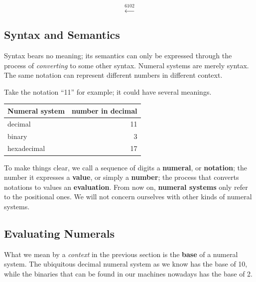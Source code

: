 \documentclass[\main/thesis.tex]{subfiles}
\begin{document}
$$ \xleftarrow{6102} $$

\subsection{Syntax and Semantics}

Syntax bears no meaning;
its semantics can only be expressed through the process of \textit{converting} to some other syntax.
Numeral systems are merely syntax.
The same notation can represent different numbers in different context.

Take the notation ``11'' for example; it could have several meanings.

\begin{center}
    \begin{tabular}{ | l | r | }
    \textbf{Numeral system}      & \textbf{number in decimal}  \\
    \hline
    decimal             & 11    \\
    binary              & 3     \\
    hexadecimal         & 17    \\
    \end{tabular}
\end{center}

To make things clear, we call a sequence of digits a \textbf{numeral}, or \textbf{notation};
the number it expresses a \textbf{value}, or simply a \textbf{number};
the process that converts notations to values an \textbf{evaluation}.
From now on, \textbf{numeral systems} only refer to the positional ones.
We will not concern ourselves with other kinds of numeral systems.

\subsection{Evaluating Numerals}

What we mean by a \textit{context} in the previous section is the \textbf{base}
of a numeral system.
The ubiquitous decimal numeral system as we know has the base of 10,
while the binaries that can be found in our machines nowadays has the base of 2.
\end{document}
